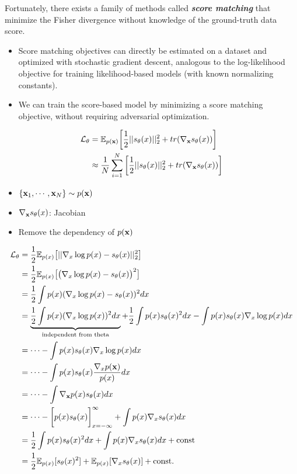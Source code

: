 Fortunately, there exists a family of methods called \textbf{\textit{score matching}} that minimize the Fisher divergence without knowledge of the ground-truth data score.
\begin{itemize}
	\item Score matching objectives can directly be estimated on a dataset and optimized with stochastic gradient descent, analogous to the log-likelihood objective for training likelihood-based models (with known normalizing constants).
	\item We can train the score-based model by minimizing a score matching objective, without requiring adversarial optimization.
\end{itemize}
\begin{align*}
	\mathcal{L}_{\theta} &=  \mathbb{E}_{p({\mathbf{x}})}\bigg[\frac{1}{2}||s_\theta(x)||^2_2+tr(\nabla_{{\mathbf{x}}}s_\theta(x))\bigg]\\
	&\approx \frac{1}{N}\sum_{i=1}^N\bigg[\frac{1}{2}||s_\theta(x)||^2_2+tr(\nabla_{{\mathbf{x}}}s_\theta(x))\bigg]
	\label{eq:score_integration}
\end{align*}
\begin{itemize}
	\item $\{{\mathbf{x}}_1, \cdots, {\mathbf{x}}_N\}\sim  p({\mathbf{x}})$
	\item $\nabla_{{\mathbf{x}}}s_\theta(x)$: Jacobian
	\item Remove the dependency of $p({\mathbf{x}})$
\end{itemize}
\begin{align}
	\mathcal{L}_{\theta} &= \frac{1}{2}\mathbb{E}_{p(x)}\big[||\nabla_x \log p(x)-s_\theta(x)||^2_2\big]\\
&= \frac{1}{2}\mathbb{E}_{p(x)}\big[\big(\nabla_x \log p(x)-s_\theta(x)\big)^2\big]\\
&= \frac{1}{2}\int p(x)(\nabla_x \log p(x)-s_\theta(x))^2dx\\
&= \underbrace{\frac{1}{2}\int p(x)(\nabla_x \log p(x))^2dx}_{\textrm{independent from theta}}+\frac{1}{2}\int p(x)s_\theta(x)^2dx-\int p(x)s_\theta(x)\nabla_x \log p(x)dx\\
	&= \dots-\int p(x)s_\theta(x)\nabla_x \log p(x)dx\\
	&= \dots-\int p(x)s_\theta(x)\frac{\nabla_x p({\mathbf{x}})}{p(x)}dx\\
	&= \dots-\int \nabla_{\mathbf{x}} p(x)s_\theta(x)dx\\
	&= \dots-\bigg[p(x)s_\theta(x)\bigg]^{\infty}_{x=-\infty}+\int  p(x) \nabla_x s_\theta(x)dx\\
	&= \frac{1}{2}\int p(x)s_\theta(x)^2dx+\int  p(x) \nabla_x s_\theta(x)dx+\textrm{const}\\
	&= \frac{1}{2}\mathbb{E}_{p(x)}[s_\theta(x)^2]+\mathbb{E}_{p(x)}[\nabla_xs_\theta(x)]+ \textrm{const}.
\end{align}
